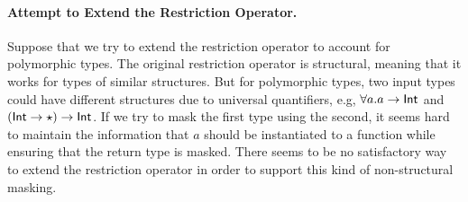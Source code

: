\paragraph{Attempt to Extend the Restriction Operator.}
Suppose that we try to extend the restriction operator to account for polymorphic
types. The original restriction operator is structural, meaning that it works
for types of similar structures. But for polymorphic types, two input types
could have different structures due to universal quantifiers, e.g, $\forall a. a
\to \mathsf{Int}$ and $(\mathsf{Int} \to \star) \to \mathsf{Int}$. If we try to mask the first type
using the second, it seems hard to maintain the information that $a$ should be
instantiated to a function while ensuring that the return type is masked. There
seems to be no satisfactory way to extend the restriction operator in order to
support this kind of non-structural masking.

